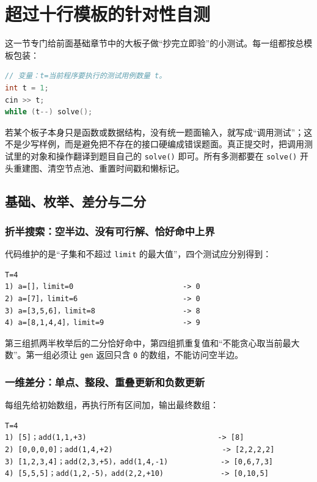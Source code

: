 \section{超过十行模板的针对性自测}

这一节专门给前面基础章节中的大板子做``抄完立即验''的小测试。每一组都按总模板包装：

\begin{lstlisting}[language={C++}]
// 变量：t=当前程序要执行的测试用例数量 t。
int t = 1;
cin >> t;
while (t--) solve();
\end{lstlisting}

若某个板子本身只是函数或数据结构，没有统一题面输入，就写成``调用测试''；这不是少写样例，而是避免把不存在的接口硬编成错误题面。真正提交时，把调用测试里的对象和操作翻译到题目自己的 \passthrough{\lstinline!solve()!} 即可。所有多测都要在 \passthrough{\lstinline!solve()!} 开头重建图、清空节点池、重置时间戳和懒标记。

\subsection{基础、枚举、差分与二分}

\subsubsection{折半搜索：空半边、没有可行解、恰好命中上界}

代码维护的是``子集和不超过 \passthrough{\lstinline!limit!} 的最大值''，四个测试应分别得到：

\begin{lstlisting}
T=4
1) a=[]，limit=0                         -> 0
2) a=[7]，limit=6                        -> 0
3) a=[3,5,6]，limit=8                    -> 8
4) a=[8,1,4,4]，limit=9                  -> 9
\end{lstlisting}

第三组抓两半枚举后的二分恰好命中，第四组抓重复值和``不能贪心取当前最大数''。第一组必须让 \passthrough{\lstinline!gen!} 返回只含 \passthrough{\lstinline!0!} 的数组，不能访问空半边。

\subsubsection{一维差分：单点、整段、重叠更新和负数更新}

每组先给初始数组，再执行所有区间加，输出最终数组：

\begin{lstlisting}
T=4
1) [5]；add(1,1,+3)                              -> [8]
2) [0,0,0,0]；add(1,4,+2)                         -> [2,2,2,2]
3) [1,2,3,4]；add(2,3,+5)，add(1,4,-1)            -> [0,6,7,3]
4) [5,5,5]；add(1,2,-5)，add(2,2,+10)             -> [0,10,5]
\end{lstlisting}

